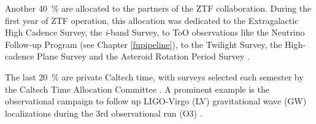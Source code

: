 Another \SI{40}{\percent} are allocated to the partners of the ZTF collaboration. During the first year of ZTF operation, this allocation was dedicated to the Extragalactic High Cadence Survey, the \textit{i}-band Survey, to ToO observations like the Neutrino Follow-up Program (see Chapter \ref{fupipeline}), to the Twilight Survey, the High-cadence Plane Survey and the Asteroid Rotation Period Survey \cite{Bellm2019a}.

The last \SI{20}{\percent} are private Caltech time, with surveys selected each semester by the Caltech Time Allocation Committee \cite{Bellm2019a}. A prominent example is the observational campaign to follow up 
LIGO-Virgo (LV)  gravitational wave (GW) localizations during the 3rd observational run (O3) .
